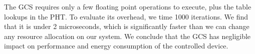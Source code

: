 The GCS requires only a few floating point operations to execute, plus
the table lookups in the PHT.  To evaluate its overhead, we time 1000
iterations.  We find that it is under 2 microseconds, which is
significantly faster than we can change any resource allocation on our
system.  We conclude that the GCS has negligible impact on performance
and energy consumption of the controlled device.










